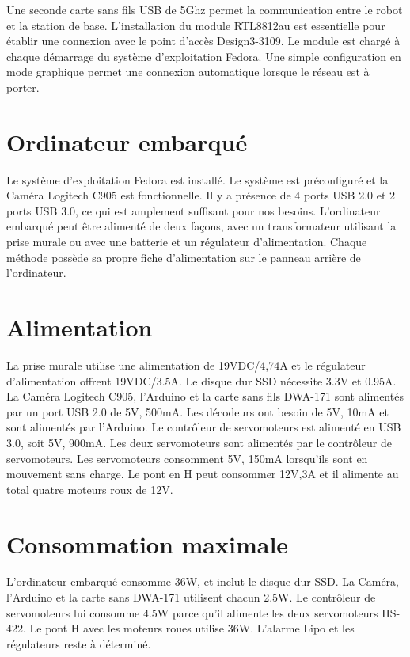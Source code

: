  Une seconde carte sans fils USB de 5Ghz permet la communication entre le robot et la station de base. L’installation du module RTL8812au est essentielle pour établir une connexion avec le point d’accès Design3-3109. Le module est chargé à chaque démarrage du système d’exploitation Fedora. Une simple configuration en mode graphique permet une connexion automatique lorsque le réseau est à porter. 

\section{Ordinateur embarqué}
 Le système d’exploitation Fedora est installé. Le système est préconfiguré et la Caméra Logitech C905 est fonctionnelle.  Il y a présence de 4 ports USB 2.0 et 2 ports USB 3.0, ce qui est amplement suffisant pour nos besoins. L’ordinateur embarqué peut être alimenté de deux façons, avec un transformateur utilisant la prise murale ou avec une batterie et un régulateur d’alimentation. Chaque méthode possède sa propre fiche d’alimentation sur le panneau arrière de l’ordinateur. 


\section{Alimentation}
  La prise murale utilise une alimentation de 19VDC/4,74A et le régulateur d’alimentation offrent 19VDC/3.5A. Le disque dur SSD nécessite 3.3V et 0.95A. La Caméra Logitech C905, l’Arduino et la carte sans fils DWA-171 sont alimentés par un port USB 2.0 de 5V, 500mA. Les décodeurs ont besoin de 5V, 10mA et sont alimentés par l’Arduino. Le contrôleur de servomoteurs est alimenté en USB 3.0, soit 5V, 900mA. Les deux servomoteurs sont alimentés par le contrôleur de servomoteurs. Les servomoteurs consomment 5V, 150mA lorsqu’ils sont en mouvement sans charge. Le pont en H peut consommer 12V,3A et il alimente au total quatre moteurs roux de 12V.

\section{Consommation maximale}
L’ordinateur embarqué consomme 36W, et inclut le disque dur SSD. La Caméra, l’Arduino et la carte sans DWA-171 utilisent chacun 2.5W. Le contrôleur de servomoteurs lui consomme 4.5W parce qu’il alimente les deux servomoteurs HS-422. Le pont H avec les moteurs roues utilise 36W. L’alarme Lipo et les régulateurs reste à déterminé. 
